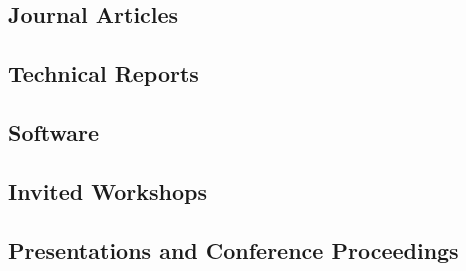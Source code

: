 \documentclass{article}
\begin{document}
\subsection*{Journal Articles}

	\begin{refsection}
		\nocite{*}
		\printbibliography[heading=none]
	\end{refsection}

\subsection*{Technical Reports}

	\begin{refsection}
		\nocite{*}
		\printbibliography[heading=none]
	\end{refsection}

\subsection*{Software}

	\begin{refsection}
		\nocite{*}
		\printbibliography[heading=none]
	\end{refsection}

\subsection*{Invited Workshops}

	\begin{refsection}
		\nocite{*}
		\printbibliography[heading=none]
	\end{refsection}

\subsection*{Presentations and Conference Proceedings}

	\begin{refsection}
		\nocite{*}
		\printbibliography[heading=none]
	\end{refsection}
\end{document}
